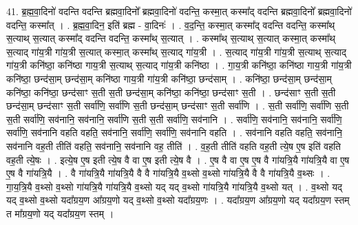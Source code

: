 \documentclass[17pt]{extarticle}
\begin{document}
41. ब्र॒ह्म॒वा॒दिनो॑ वदन्ति वदन्ति ब्रह्मवा॒दिनो᳚ ब्रह्मवा॒दिनो॑ वदन्ति॒ कस्मा॒त् कस्मा᳚द् वदन्ति ब्रह्मवा॒दिनो᳚ ब्रह्मवा॒दिनो॑ वदन्ति॒ कस्मा᳚त् । . ब्र॒ह्म॒वा॒दिन॒ इति॑ ब्रह्म - वा॒दिनः॑ । . व॒द॒न्ति॒ कस्मा॒त् कस्मा᳚द् वदन्ति वदन्ति॒ कस्मा᳚थ् स॒त्याथ् स॒त्यात् कस्मा᳚द् वदन्ति वदन्ति॒ कस्मा᳚थ् स॒त्यात् । . कस्मा᳚थ् स॒त्याथ् स॒त्यात् कस्मा॒त् कस्मा᳚थ् स॒त्याद् गा॑य॒त्री गा॑य॒त्री स॒त्यात् कस्मा॒त् कस्मा᳚थ् स॒त्याद् गा॑य॒त्री । . स॒त्याद् गा॑य॒त्री गा॑य॒त्री स॒त्याथ् स॒त्याद् गा॑य॒त्री कनि॑ष्ठा॒ कनि॑ष्ठा गाय॒त्री स॒त्याथ् स॒त्याद् गा॑य॒त्री कनि॑ष्ठा । . गा॒य॒त्री कनि॑ष्ठा॒ कनि॑ष्ठा गाय॒त्री गा॑य॒त्री कनि॑ष्ठा॒ छन्द॑सा॒म् छन्द॑सा॒म् कनि॑ष्ठा गाय॒त्री गा॑य॒त्री कनि॑ष्ठा॒ छन्द॑साम् । . कनि॑ष्ठा॒ छन्द॑सा॒म् छन्द॑सा॒म् कनि॑ष्ठा॒ कनि॑ष्ठा॒ छन्द॑साꣳ स॒ती स॒ती छन्द॑सा॒म् कनि॑ष्ठा॒ कनि॑ष्ठा॒ छन्द॑साꣳ स॒ती । . छन्द॑साꣳ स॒ती स॒ती छन्द॑सा॒म् छन्द॑साꣳ स॒ती सर्वा॑णि॒ सर्वा॑णि स॒ती छन्द॑सा॒म् छन्द॑साꣳ स॒ती सर्वा॑णि । . स॒ती सर्वा॑णि॒ सर्वा॑णि स॒ती स॒ती सर्वा॑णि॒ सव॑नानि॒ सव॑नानि॒ सर्वा॑णि स॒ती स॒ती सर्वा॑णि॒ सव॑नानि । . सर्वा॑णि॒ सव॑नानि॒ सव॑नानि॒ सर्वा॑णि॒ सर्वा॑णि॒ सव॑नानि वहति वहति॒ सव॑नानि॒ सर्वा॑णि॒ सर्वा॑णि॒ सव॑नानि वहति । . सव॑नानि वहति वहति॒ सव॑नानि॒ सव॑नानि वह॒ती तीति॑ वहति॒ सव॑नानि॒ सव॑नानि वह॒ तीति॑ । . व॒ह॒ती तीति॑ वहति वह॒ती त्ये॒ष ए॒ष इति॑ वहति वह॒ती त्ये॒षः । . इत्ये॒ष ए॒ष इती त्ये॒ष वै वा ए॒ष इती त्ये॒ष वै । . ए॒ष वै वा ए॒ष ए॒ष वै गा॑यत्रि॒यै गा॑यत्रि॒यै वा ए॒ष ए॒ष वै गा॑यत्रि॒यै । . वै गा॑यत्रि॒यै गा॑यत्रि॒यै वै वै गा॑यत्रि॒यै व॒थ्सो व॒थ्सो गा॑यत्रि॒यै वै वै गा॑यत्रि॒यै व॒थ्सः । . गा॒य॒त्रि॒यै व॒थ्सो व॒थ्सो गा॑यत्रि॒यै गा॑यत्रि॒यै व॒थ्सो यद् यद् व॒थ्सो गा॑यत्रि॒यै गा॑यत्रि॒यै व॒थ्सो यत् । . व॒थ्सो यद् यद् व॒थ्सो व॒थ्सो यदा᳚ग्रय॒ण आ᳚ग्रय॒णो यद् व॒थ्सो व॒थ्सो यदा᳚ग्रय॒णः । . यदा᳚ग्रय॒ण आ᳚ग्रय॒णो यद् यदा᳚ग्रय॒ण स्तम् त मा᳚ग्रय॒णो यद् यदा᳚ग्रय॒ण स्तम् । \newline
\end{document}
